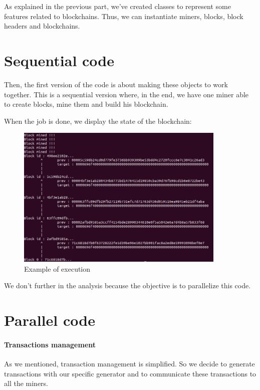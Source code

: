 As explained in the previous part, we've created classes to represent some features related to blockchains. Thus, we can instantiate miners, blocks, block headers and blockchains.

\section{Sequential code}

Then, the first version of the code is about making these objects to work together. This is a sequential version where, in the end, we have one miner able to create blocks, mine them and build his blockchain.

When the job is done, we display the state of the blockchain: \newline

\begin{figure}[ht]
\centering
\includegraphics[width=10cm]{Figures/sequentialCode}
\caption{Example of execution}
\end{figure}
\medskip

We don't further in the analysis because the objective is to parallelize this code.

\section{Parallel code}

\paragraph{Transactions management}

As we mentioned, transaction management is simplified. So we decide to generate transactions with our specific generator and to communicate these transactions to all the miners. \newline

